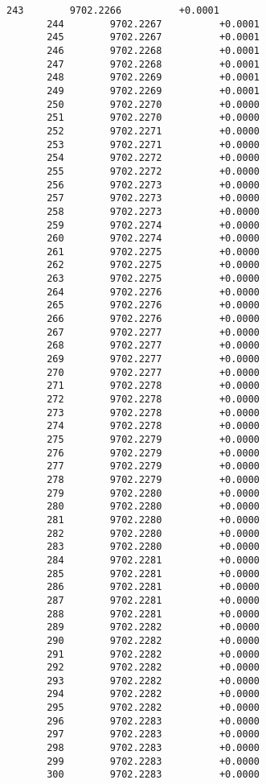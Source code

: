 \documentclass[11pt]{article}
\begin{document}
\begin{Verbatim}[commandchars=\\\{\}]
       243        9702.2266          +0.0001
       244        9702.2267          +0.0001
       245        9702.2267          +0.0001
       246        9702.2268          +0.0001
       247        9702.2268          +0.0001
       248        9702.2269          +0.0001
       249        9702.2269          +0.0001
       250        9702.2270          +0.0000
       251        9702.2270          +0.0000
       252        9702.2271          +0.0000
       253        9702.2271          +0.0000
       254        9702.2272          +0.0000
       255        9702.2272          +0.0000
       256        9702.2273          +0.0000
       257        9702.2273          +0.0000
       258        9702.2273          +0.0000
       259        9702.2274          +0.0000
       260        9702.2274          +0.0000
       261        9702.2275          +0.0000
       262        9702.2275          +0.0000
       263        9702.2275          +0.0000
       264        9702.2276          +0.0000
       265        9702.2276          +0.0000
       266        9702.2276          +0.0000
       267        9702.2277          +0.0000
       268        9702.2277          +0.0000
       269        9702.2277          +0.0000
       270        9702.2277          +0.0000
       271        9702.2278          +0.0000
       272        9702.2278          +0.0000
       273        9702.2278          +0.0000
       274        9702.2278          +0.0000
       275        9702.2279          +0.0000
       276        9702.2279          +0.0000
       277        9702.2279          +0.0000
       278        9702.2279          +0.0000
       279        9702.2280          +0.0000
       280        9702.2280          +0.0000
       281        9702.2280          +0.0000
       282        9702.2280          +0.0000
       283        9702.2280          +0.0000
       284        9702.2281          +0.0000
       285        9702.2281          +0.0000
       286        9702.2281          +0.0000
       287        9702.2281          +0.0000
       288        9702.2281          +0.0000
       289        9702.2282          +0.0000
       290        9702.2282          +0.0000
       291        9702.2282          +0.0000
       292        9702.2282          +0.0000
       293        9702.2282          +0.0000
       294        9702.2282          +0.0000
       295        9702.2282          +0.0000
       296        9702.2283          +0.0000
       297        9702.2283          +0.0000
       298        9702.2283          +0.0000
       299        9702.2283          +0.0000
       300        9702.2283          +0.0000

\end{Verbatim}
\end{document}
